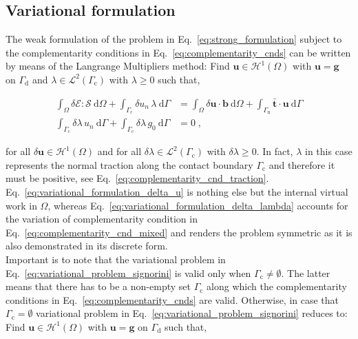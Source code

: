 \documentclass[10pt,a4paper]{article}
\begin{document}
\subsection{Variational formulation}\label{subsec:variational_formulation}

The weak formulation of the problem in Eq.~\eqref{eq:strong_formulation} subject to the complementarity conditions in Eq.~\eqref{eq:complementarity_cnds} can be written by means of the Langrange Multipliers method: Find $\mathbf{u} \in \boldsymbol{\mathcal{H}}^1 (\Omega)$ with $\mathbf{u} = \mathbf{g}$ on $\Gamma_{\text{d}}$ and $\lambda \in \mathcal{L}^2(\Gamma_{\text{c}})$ with $\lambda \ge 0$ such that,

\begin{subequations}
	\begin{alignat}{1}
		\int_{\Omega} \delta \boldsymbol{\mathcal{E}} : \boldsymbol{\mathcal{S}} \: \text{d} \Omega + \int_{\Gamma_{\text{c}}} \delta u_n \, \lambda \: \text{d} \Gamma &= \int_{\Omega} \delta \mathbf{u} \cdot \mathbf{b} \: \text{d} \Omega + \int_{\Gamma_{\text{n}}} \bar{\mathbf{t}} \cdot \mathbf{u} \: \text{d} \Gamma \label{eq:variational_formulation_delta_u} \\
		\int_{\Gamma_{\text{c}}} \delta \lambda \, u_n \: \text{d} \Gamma + \int_{\Gamma_{\text{c}}} \delta \lambda \, g_0 \: \text{d} \Gamma &= 0 \;, \label{eq:variational_formulation_delta_lambda}
	\end{alignat}
	\label{eq:variational_problem_signorini}
\end{subequations}

for all $\delta \mathbf{u} \in \boldsymbol{\mathcal{H}}^1 (\Omega)$ and for all $\delta \lambda \in \mathcal{L}^2(\Gamma_{\text{c}})$ with $\delta \lambda \ge 0$. In fact, $\lambda$ in this case represents the normal traction along the contact boundary $\Gamma_{\text{c}}$ and therefore it must be positive, see Eq.~\eqref{eq:complementarity_cnd_traction}. Eq.~\eqref{eq:variational_formulation_delta_u} is nothing else but the internal virtual work in $\Omega$, whereas Eq.~\eqref{eq:variational_formulation_delta_lambda} accounts for the variation of complementarity condition in Eq.~\eqref{eq:complementarity_cnd_mixed} and renders the problem symmetric as it is also demonstrated in its discrete form.\\

Important is to note that the variational problem in Eq.~\eqref{eq:variational_problem_signorini} is valid only when $\Gamma_{\text{c}} \neq \emptyset$. The latter means that there has to be a non-empty set $\Gamma_{\text{c}}$ along which the complementarity conditions in Eq.~\eqref{eq:complementarity_cnds} are valid. Otherwise, in case that $\Gamma_{\text{c}} = \emptyset$ variational problem in Eq.~\eqref{eq:variational_problem_signorini} reduces to: Find $\mathbf{u} \in \boldsymbol{\mathcal{H}}^1 (\Omega)$ with $\mathbf{u} = \mathbf{g}$ on $\Gamma_{\text{d}}$ such that,
\end{document}
